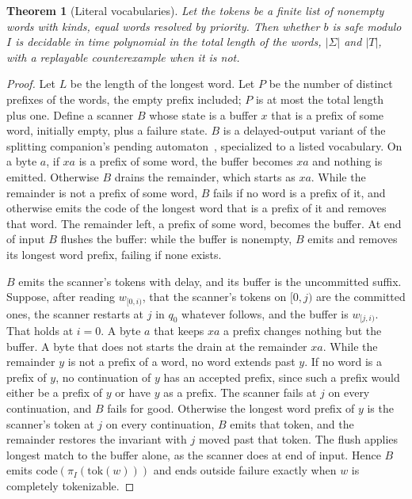 \documentclass[11pt,a4paper]{article}
\theoremstyle{definition}
\theoremstyle{plain}
\newtheorem{theorem}{Theorem}
\begin{document}
\begin{theorem}[Literal vocabularies]
\label{thm:literal}
Let the tokens be a finite list of nonempty words with kinds, equal words resolved by priority. Then whether $b$ is safe
modulo $I$ is decidable in time polynomial in the total length of the words, $|\Sigma|$ and $|T|$, with a replayable
counterexample when it is not.
\end{theorem}

\begin{proof}
Let $L$ be the length of the longest word. Let $P$ be the number of distinct prefixes of the words, the empty prefix
included; $P$ is at most the total length plus one. Define a scanner $B$ whose state is a buffer $x$ that is a prefix of
some word, initially empty, plus a failure state. $B$ is a delayed-output variant of the splitting companion's pending
automaton~\cite{nidhogg2026certifiedsplitting}, specialized to a listed vocabulary. On a byte $a$, if $xa$ is a prefix
of some word, the buffer becomes $xa$ and nothing is emitted. Otherwise $B$ drains the remainder, which starts as $xa$.
While the remainder is not a prefix of some word, $B$ fails if no word is a prefix of it, and otherwise emits the code
of the longest word that is a prefix of it and removes that word. The remainder left, a prefix of some word, becomes the
buffer. At end of input $B$ flushes the buffer: while the buffer is nonempty, $B$ emits and removes its longest word
prefix, failing if none exists.

$B$ emits the scanner's tokens with delay, and its buffer is the uncommitted suffix. Suppose, after reading $w_{[0,i)}$,
that the scanner's tokens on $[0, j)$ are the committed ones, the scanner restarts at $j$ in $q_0$ whatever follows, and
the buffer is $w_{[j,i)}$. That holds at $i = 0$. A byte $a$ that keeps $xa$ a prefix changes nothing but the buffer. A
byte that does not starts the drain at the remainder $xa$. While the remainder $y$ is not a prefix of a word, no word
extends past $y$. If no word is a prefix of $y$, no continuation of $y$ has an accepted prefix, since such a prefix
would either be a prefix of $y$ or have $y$ as a prefix. The scanner fails at $j$ on every continuation, and $B$ fails
for good. Otherwise the longest word prefix of $y$ is the scanner's token at $j$ on every continuation, $B$ emits that
token, and the remainder restores the invariant with $j$ moved past that token. The flush applies longest match to the
buffer alone, as the scanner does at end of input. Hence $B$ emits $\mathrm{code}(\pi_I(\mathrm{tok}(w)))$ and ends
outside failure exactly when $w$ is completely tokenizable.


\end{proof}
\end{document}
